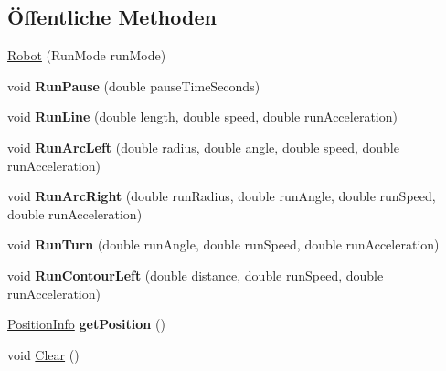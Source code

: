 \subsection*{Öffentliche Methoden}
\begin{DoxyCompactItemize}
\item 
\hyperlink{class_robot_ctrl_1_1_robot_acdd921df41328916b058eaad84ed3078}{Robot} (RunMode runMode)
\item 
\hypertarget{class_robot_ctrl_1_1_robot_a95c4c2d60e88ff9d6827d8d97eee2386}{
void {\bfseries RunPause} (double pauseTimeSeconds)}
\label{class_robot_ctrl_1_1_robot_a95c4c2d60e88ff9d6827d8d97eee2386}

\item 
\hypertarget{class_robot_ctrl_1_1_robot_a6a16f9f310f34fbe408bb7ab51a89a32}{
void {\bfseries RunLine} (double length, double speed, double runAcceleration)}
\label{class_robot_ctrl_1_1_robot_a6a16f9f310f34fbe408bb7ab51a89a32}

\item 
\hypertarget{class_robot_ctrl_1_1_robot_a07b940c45155aae3b6ae5ce7d58a90f1}{
void {\bfseries RunArcLeft} (double radius, double angle, double speed, double runAcceleration)}
\label{class_robot_ctrl_1_1_robot_a07b940c45155aae3b6ae5ce7d58a90f1}

\item 
\hypertarget{class_robot_ctrl_1_1_robot_aaff244d591788ca15722234a71cee2be}{
void {\bfseries RunArcRight} (double runRadius, double runAngle, double runSpeed, double runAcceleration)}
\label{class_robot_ctrl_1_1_robot_aaff244d591788ca15722234a71cee2be}

\item 
\hypertarget{class_robot_ctrl_1_1_robot_ae9c9a939809668a900df594a31e5bba3}{
void {\bfseries RunTurn} (double runAngle, double runSpeed, double runAcceleration)}
\label{class_robot_ctrl_1_1_robot_ae9c9a939809668a900df594a31e5bba3}

\item 
\hypertarget{class_robot_ctrl_1_1_robot_a1fe7604ec3a28152fc34659fdd1f2489}{
void {\bfseries RunContourLeft} (double distance, double runSpeed, double runAcceleration)}
\label{class_robot_ctrl_1_1_robot_a1fe7604ec3a28152fc34659fdd1f2489}

\item 
\hypertarget{class_robot_ctrl_1_1_robot_ae727424d84ab02d96e1cfb22ecc18dcd}{
\hyperlink{struct_robot_ctrl_1_1_position_info}{PositionInfo} {\bfseries getPosition} ()}
\label{class_robot_ctrl_1_1_robot_ae727424d84ab02d96e1cfb22ecc18dcd}

\item 
void \hyperlink{class_robot_ctrl_1_1_robot_afb01a74bfcb74eab60f041a368f93737}{Clear} ()
\end{DoxyCompactItemize}
